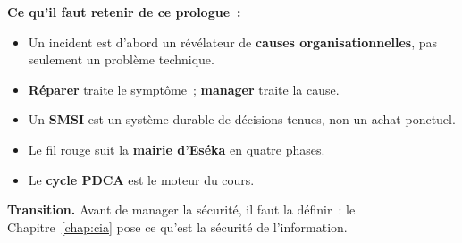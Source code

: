 \begin{boxresume}
\textbf{Ce qu'il faut retenir de ce prologue~:}
\begin{itemize}
    \item Un incident est d'abord un révélateur de \textbf{causes
          organisationnelles}, pas seulement un problème technique.
    \item \textbf{Réparer} traite le symptôme~; \textbf{manager} traite la
          cause.
    \item Un \textbf{SMSI} est un système durable de décisions tenues, non un
          achat ponctuel.
    \item Le fil rouge suit la \textbf{mairie d'Eséka} en quatre phases.
    \item Le \textbf{cycle PDCA} est le moteur du cours.
\end{itemize}
\end{boxresume}

\begin{boxinfo}
\textbf{Transition.} Avant de manager la sécurité, il faut la définir~: le
Chapitre~\ref{chap:cia} pose ce qu'est la sécurité de l'information.
\end{boxinfo}
